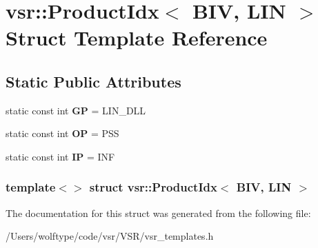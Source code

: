 \hypertarget{structvsr_1_1_product_idx_3_01_b_i_v_00_01_l_i_n_01_4}{\section{vsr\-:\-:Product\-Idx$<$ B\-I\-V, L\-I\-N $>$ Struct Template Reference}
\label{structvsr_1_1_product_idx_3_01_b_i_v_00_01_l_i_n_01_4}
}
\subsection*{Static Public Attributes}
\begin{DoxyCompactItemize}
\item 
\hypertarget{structvsr_1_1_product_idx_3_01_b_i_v_00_01_l_i_n_01_4_a25ac1a679ea83021fc4faeb3fd3fa957}{static const int {\bfseries G\-P} = L\-I\-N\-\_\-\-D\-L\-L}\label{structvsr_1_1_product_idx_3_01_b_i_v_00_01_l_i_n_01_4_a25ac1a679ea83021fc4faeb3fd3fa957}

\item 
\hypertarget{structvsr_1_1_product_idx_3_01_b_i_v_00_01_l_i_n_01_4_aecb66b56b75f9003edecd4c5790f6641}{static const int {\bfseries O\-P} = P\-S\-S}\label{structvsr_1_1_product_idx_3_01_b_i_v_00_01_l_i_n_01_4_aecb66b56b75f9003edecd4c5790f6641}

\item 
\hypertarget{structvsr_1_1_product_idx_3_01_b_i_v_00_01_l_i_n_01_4_a94efc93fdb11de54fb4ba76aa3f40ab6}{static const int {\bfseries I\-P} = I\-N\-F}\label{structvsr_1_1_product_idx_3_01_b_i_v_00_01_l_i_n_01_4_a94efc93fdb11de54fb4ba76aa3f40ab6}

\end{DoxyCompactItemize}
\subsubsection*{template$<$$>$ struct vsr\-::\-Product\-Idx$<$ B\-I\-V, L\-I\-N $>$}



The documentation for this struct was generated from the following file\-:\begin{DoxyCompactItemize}
\item 
/\-Users/wolftype/code/vsr/\-V\-S\-R/vsr\-\_\-templates.\-h\end{DoxyCompactItemize}

